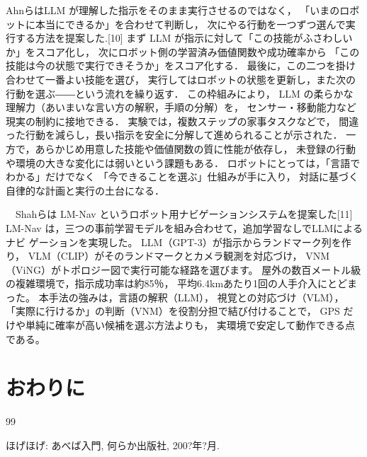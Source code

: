 \documentclass[dvipdfmx]{jarticle}
\begin{document}
 AhnらはLLM が理解した指示をそのまま実行させるのではなく，
 「いまのロボットに本当にできるか」を合わせて判断し，
 次にやる行動を一つずつ選んで実行する方法を提案した.[10]
 まず LLM が指示に対して「この技能がふさわしいか」をスコア化し，
 次にロボット側の学習済み価値関数や成功確率から
 「この技能は今の状態で実行できそうか」をスコア化する．
 最後に，この二つを掛け合わせて一番よい技能を選び，
 実行してはロボットの状態を更新し，また次の行動を選ぶ――という流れを繰り返す．
 この枠組みにより，
 LLM の柔らかな理解力（あいまいな言い方の解釈，手順の分解）を，
 センサー・移動能力など現実の制約に接地できる．
 実験では，複数ステップの家事タスクなどで，
 間違った行動を減らし，長い指示を安全に分解して進められることが示された．
 一方で，あらかじめ用意した技能や価値関数の質に性能が依存し，
 未登録の行動や環境の大きな変化には弱いという課題もある．
 ロボットにとっては，「言語でわかる」だけでなく
 「今できることを選ぶ」仕組みが手に入り，
 対話に基づく自律的な計画と実行の土台になる．
 
　Shahらは LM-Nav というロボット用ナビゲーションシステムを提案した[11]
 LM-Nav は，三つの事前学習モデルを組み合わせて，追加学習なしでLLMによるナビ
 ゲーションを実現した。
 LLM（GPT-3）が指示からランドマーク列を作り，
 VLM（CLIP）がそのランドマークとカメラ観測を対応づけ，
 VNM（ViNG）がトポロジー図で実行可能な経路を選びます。
 屋外の数百メートル級の複雑環境で，指示成功率は約85％，
 平均6.4kmあたり1回の人手介入にとどまった。
 本手法の強みは，言語の解釈（LLM），
 視覚との対応づけ（VLM），
 「実際に行けるか」の判断（VNM）を役割分担で結び付けることで，
 GPS だけや単純に確率が高い候補を選ぶ方法よりも，
 実環境で安定して動作できる点である。
\section{おわりに}





\begin{thebibliography}{99}
\label{sannkoubunnkenn_chapter}

ほげほげ: あべば入門, 何らか出版社, 200?年?月.

\end{thebibliography}
\end{document}
